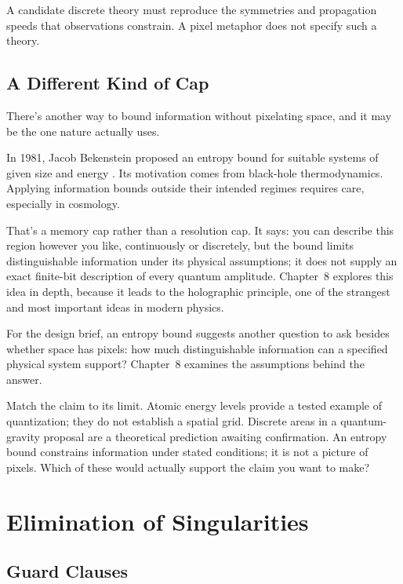 A candidate discrete theory must reproduce the symmetries and propagation speeds that observations constrain. A pixel metaphor does not specify such a theory.

\subsection{A Different Kind of Cap}

There's another way to bound information without pixelating space, and it may be the one nature actually uses.

In 1981, Jacob Bekenstein proposed an entropy bound for suitable systems of given size and energy \cite{bekenstein1981}. Its motivation comes from black-hole thermodynamics. Applying information bounds outside their intended regimes requires care, especially in cosmology.

That's a memory cap rather than a resolution cap. It says: you can describe this region however you like, continuously or discretely, but the bound limits distinguishable information under its physical assumptions; it does not supply an exact finite-bit description of every quantum amplitude. Chapter~8 explores this idea in depth, because it leads to the holographic principle, one of the strangest and most important ideas in modern physics.

For the design brief, an entropy bound suggests another question to ask besides whether space has pixels: how much distinguishable information can a specified physical system support? Chapter~8 examines the assumptions behind the answer.

\begin{quickpracticebox}
Match the claim to its limit. Atomic energy levels provide a tested example of quantization; they do not establish a spatial grid. Discrete areas in a quantum-gravity proposal are a theoretical prediction awaiting confirmation. An entropy bound constrains information under stated conditions; it is not a picture of pixels. Which of these would actually support the claim you want to make?
\end{quickpracticebox}

\section{Elimination of Singularities}

\subsection{Guard Clauses}

